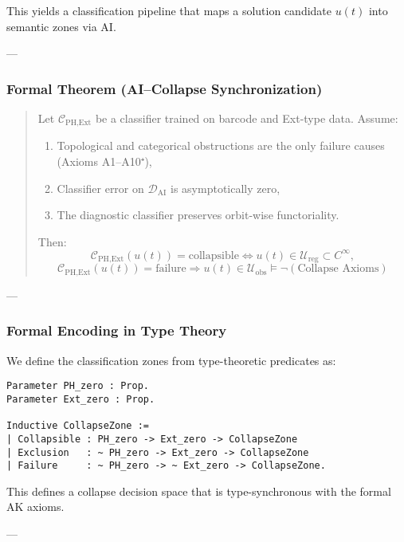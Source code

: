 \documentclass[11pt]{article}
\begin{document}
\begin{axiom}
\begin{axiom}
{{This yields a classification pipeline that maps a solution candidate \( u(t) \) into semantic zones via AI.

---

\subsubsection*{Formal Theorem (AI–Collapse Synchronization)}

\begin{quote}
Let \( \mathcal{C}_{\text{PH,Ext}} \) be a classifier trained on barcode and Ext-type data.  
Assume:

\begin{enumerate}
  \item Topological and categorical obstructions are the only failure causes (Axioms A1–A10⁺),
  \item Classifier error on \(\mathcal{D}_{\text{AI}}\) is asymptotically zero,
  \item The diagnostic classifier preserves orbit-wise functoriality.
\end{enumerate}

Then:
\[
\mathcal{C}_{\text{PH,Ext}}(u(t)) = \text{collapsible} \Leftrightarrow u(t) \in \mathcal{U}_{\mathrm{reg}} \subset C^\infty,
\]
\[
\mathcal{C}_{\text{PH,Ext}}(u(t)) = \text{failure} \Rightarrow u(t) \in \mathcal{U}_{\mathrm{obs}} \models \neg(\text{Collapse Axioms})
\]
\end{quote}

---

\subsubsection*{Formal Encoding in Type Theory}

We define the classification zones from type-theoretic predicates as:

\begin{lstlisting}[language=Coq, caption=Collapse Zone Typing via PH and Ext Flags]
Parameter PH_zero : Prop.
Parameter Ext_zero : Prop.

Inductive CollapseZone :=
| Collapsible : PH_zero -> Ext_zero -> CollapseZone
| Exclusion   : ~ PH_zero -> Ext_zero -> CollapseZone
| Failure     : ~ PH_zero -> ~ Ext_zero -> CollapseZone.
\end{lstlisting}

This defines a collapse decision space that is type-synchronous with the formal AK axioms.

---

}}
\end{axiom}
\end{axiom}
\end{document}
